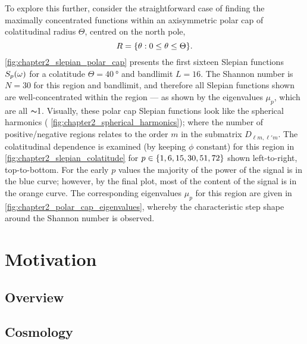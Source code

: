 To explore this further, consider the straightforward case of finding the maximally concentrated functions within an axisymmetric polar cap of colatitudinal radius \(\Theta{}\), centred on the north pole, \ie{}
%
\begin{equation}
	R
	= \{\theta: 0 \leq \theta \leq \Theta\}.
\end{equation}
%
\cref{fig:chapter2_slepian_polar_cap} presents the first sixteen Slepian functions \({S}_{p}(\omega)\) for a colatitude \(\Theta=\SI{40}{\degree}\) and bandlimit \(L=16\).
The Shannon number is \(N=30\) for this region and bandlimit, and therefore all Slepian functions shown are well-concentrated within the region --- as shown by the eigenvalues \(\mu_{p}\), which are all \({\thicksim}1\).
Visually, these polar cap Slepian functions look like the spherical harmonics (\cf{} \cref{fig:chapter2_spherical_harmonics}); where the number of positive/negative regions relates to the order \(m\) in the submatrix \(D_{\ell m,\ell'm}\).
The colatitudinal dependence is examined (by keeping \(\phi{}\) constant) for this region in \cref{fig:chapter2_slepian_colatitude} for \(p \in \{1,6,15,30,51,72\}\) shown left-to-right, top-to-bottom.
For the early \(p\) values the majority of the power of the signal is in the blue curve; however, by the final plot, most of the content of the signal is in the orange curve.
The corresponding eigenvalues \(\mu_{p}\) for this region are given in \cref{fig:chapter2_polar_cap_eigenvalues}, whereby the characteristic step shape around the Shannon number is observed.







\section{Motivation}\label{sec:chapter2_motivation}

\subsection{Overview}

\subsection{Cosmology}



